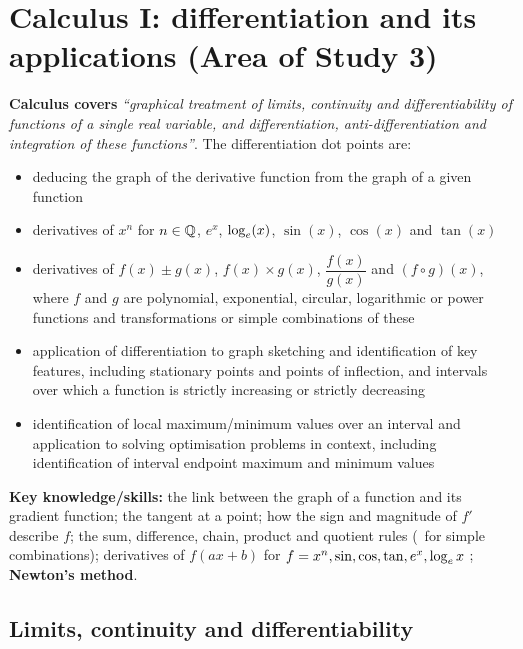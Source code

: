 \section{Calculus I: differentiation and its applications (Area of Study 3)}
\label{sec:diff}

\begin{sdbox}
\textbf{Calculus covers} \emph{``graphical treatment of limits, continuity and differentiability of functions of a single real variable, and differentiation, anti-differentiation and integration of these functions''}. The differentiation dot points are:
\begin{itemize}
  \item deducing the graph of the derivative function from the graph of a given function
  \item derivatives of $x^n$ for $n\in\mathbb{Q}$, $e^x$, $\log_e(x)$, $\sin(x)$, $\cos(x)$ and $\tan(x)$
  \item derivatives of $f(x)\pm g(x)$, $f(x)\times g(x)$, $\dfrac{f(x)}{g(x)}$ and $(f\circ g)(x)$, where $f$ and $g$ are polynomial, exponential, circular, logarithmic or power functions and transformations or simple combinations of these
  \item application of differentiation to graph sketching and identification of key features, including stationary points and points of inflection, and intervals over which a function is strictly increasing or strictly decreasing
  \item identification of local maximum/minimum values over an interval and application to solving optimisation problems in context, including identification of interval endpoint maximum and minimum values
\end{itemize}
\textbf{Key knowledge/skills:} the link between the graph of a function and its gradient function; the tangent at a point; how the sign and magnitude of $f'$ describe $f$; the sum, difference, chain, product and quotient rules (\byhand\ for simple combinations); derivatives of $f(ax+b)$ for $f=x^n,\sin,\cos,\tan,e^x,\log_e x$ \byhand; \textbf{Newton's method}.
\end{sdbox}

\subsection{Limits, continuity and differentiability}
\label{sec:cont}

